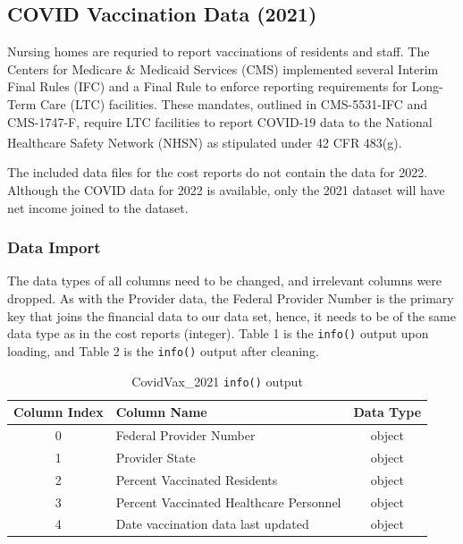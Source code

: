 \documentclass{article}
\theoremstyle{mytheoremstyle}
\theoremstyle{mytheoremstyle}
\theoremstyle{myproblemstyle}
\begin{document}
\pagebreak

\subsection{COVID Vaccination Data (2021)}
Nursing homes are requried to report vaccinations of residents and staff. The Centers for Medicare \& Medicaid Services (CMS) implemented several Interim Final Rules (IFC) and a Final Rule to enforce reporting requirements for Long-Term Care (LTC) facilities. These mandates, outlined in CMS-5531-IFC and CMS-1747-F, require LTC facilities to report COVID-19 data to the National Healthcare Safety Network (NHSN) as stipulated under 42 CFR 483(g).\textsuperscript{\cite{cmsqso2313}}

The included data files for the cost reports do not contain the data for 2022. Although the COVID data for 2022 is available, only the 2021 dataset will have net income joined to the dataset. 

\subsubsection{Data Import}
The data types of all columns need to be changed, and irrelevant columns were dropped. As with the Provider data, the Federal Provider Number is the primary key that joins the financial data to our data set, hence, it needs to be of the same data type as in the cost reports (integer). Table 1 is the \texttt{info()} output upon loading, and Table 2 is the \texttt{info()} output after cleaning. 
\begin{table}[h]
\centering
\caption{CovidVax\_2021 \texttt{info()} output}
\label{tab:dataframe_structure}
\begin{tabular}{|c|l|c|}
\hline
\textbf{Column Index} & \textbf{Column Name}                               & \textbf{Data Type} \\ \hline
0                     & Federal Provider Number                            & object             \\ \hline
1                     & Provider State                                     & object             \\ \hline
2                     & Percent Vaccinated Residents                       & object             \\ \hline
3                     & Percent Vaccinated Healthcare Personnel            & object             \\ \hline
4                     & Date vaccination data last updated                 & object             \\ \hline
\end{tabular}
\end{table}
\end{document}
